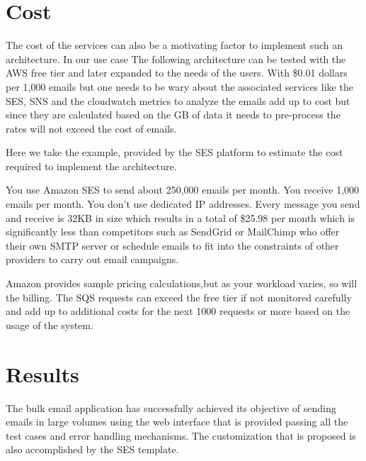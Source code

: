 \section{Cost}
The cost of the services can also be a motivating factor to implement such an architecture. In our use case The following architecture can be tested with the AWS free tier and later expanded to the needs of the users. With \$0.01 dollars per 1,000 emails but one needs to be wary about the associated services like the SES, SNS and the cloudwatch metrics to analyze the emails add up to cost but since they are calculated based on the GB of data it needs to pre-process the rates will not exceed the cost of emails.

Here we take the example, provided by the SES platform to estimate the cost required to implement the architecture.

You use Amazon SES to send about 250,000 emails per month. You receive 1,000 emails per month. You don't use dedicated IP addresses. Every message you send and receive is 32KB in size which results in a total of \$25.98 per month \cite{sespricing} which is significantly less than competitors such as SendGrid or MailChimp who offer their own SMTP server or schedule emails to fit into the constraints of other providers to carry out email campaigns. \par



Amazon provides sample pricing calculations,but as your workload varies, so will the billing. \cite{eivy2017wary} The SQS requests can exceed the free tier if not monitored carefully and add up to additional costs for the next 1000 requests or more based on the usage of the system.\par


\newpage


\section{Results}

The bulk email application has successfully achieved its objective of sending emails in large volumes using the web interface that is provided passing all the test cases and error handling mechanisms. The customization that is proposed is also accomplished by the SES template.

